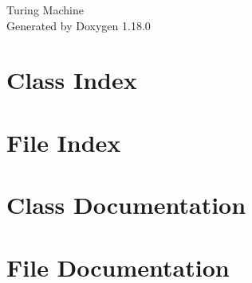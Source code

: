 \documentclass[twoside]{book}
\newcommand{\+}{\discretionary{\mbox{\scriptsize$\hookleftarrow$}}{}{}}
\newcommand{\clearemptydoublepage}{%
    \newpage{\pagestyle{empty}\cleardoublepage}%
  }
\begin{document}
  \raggedbottom
    \hypersetup{pageanchor=false,
                bookmarksnumbered=true,
                pdfencoding=unicode
               }
  \begin{titlepage}
  \vspace*{7cm}
  \begin{center}%
  {\Large Turing Machine}\\
  \vspace*{1cm}
  {\large Generated by Doxygen 1.18.0}\\
  \end{center}
  \end{titlepage}
  \clearemptydoublepage
  \tableofcontents
  \clearemptydoublepage
  \hypersetup{pageanchor=true}
\chapter{Class Index}

\chapter{File Index}

\chapter{Class Documentation}


\chapter{File Documentation}





  \backmatter
  \newpage
  \clearemptydoublepage
  \printindex
\end{document}
